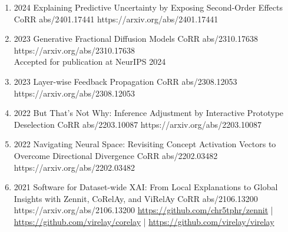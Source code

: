 {\begin{enumerate}
        \item {}
                        {2024}
                        {Explaining Predictive Uncertainty by Exposing Second-Order Effects}
                        {CoRR abs/2401.17441}
                        {https://arxiv.org/abs/2401.17441}

        \item {}
                        {2023}
                        {Generative Fractional Diffusion Models}
                        {CoRR abs/2310.17638}
                        {https://arxiv.org/abs/2310.17638}
                        {\\Accepted for publication at NeurIPS 2024}

        \item {}
                        {2023}
                        {Layer-wise Feedback Propagation}
                        {CoRR abs/2308.12053}
                        {https://arxiv.org/abs/2308.12053}

        \item {}
                        {2022}
                        {But That's Not Why: Inference Adjustment by Interactive Prototype Deselection}
                        {CoRR abs/2203.10087}
                        {https://arxiv.org/abs/2203.10087}

        \item {}
                        {2022}
                        {Navigating Neural Space: Revisiting Concept Activation Vectors to Overcome Directional Divergence}
                        {CoRR abs/2202.03482}
                        {https://arxiv.org/abs/2202.03482}

        \item {}
                        {2021}
                        {Software for Dataset-wide XAI: From Local Explanations to Global Insights with Zennit, CoRelAy, and ViRelAy}
                        {CoRR abs/2106.13200}
                        {https://arxiv.org/abs/2106.13200}
                        {   \href{https://github.com/chr5tphr/zennit}{https://github.com/chr5tphr/zennit} | \\
                            \href{https://github.com/virelay/corelay}{https://github.com/virelay/corelay} |
                            \href{https://github.com/virelay/virelay}{https://github.com/virelay/virelay}
                        }


\end{enumerate}}
